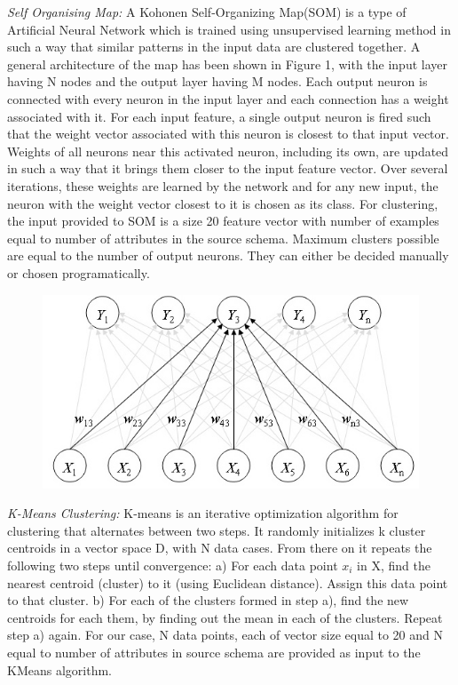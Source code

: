 \documentclass[conference]{IEEEtran}
\begin{document}
\textit{Self Organising Map\cite{SOM}: }A Kohonen Self-Organizing Map(SOM) is a type of Artificial Neural Network which is trained using unsupervised learning method in such a way that similar patterns in the input data are clustered together. A general architecture of the map has been shown in Figure 1, with the input layer having N nodes and the output layer having M nodes. Each output neuron is connected with every neuron in the input layer and each connection has a weight associated with it. For each input feature, a single output neuron is fired such that the weight vector associated with this neuron is closest to that input vector. Weights of all neurons near this activated neuron, including its own, are updated in such a way that it brings them closer to the input feature vector. Over several iterations, these weights are learned by the network and for any new input, the neuron with the weight vector closest to it is chosen as its class. For clustering, the input provided to SOM is a size 20 feature vector with number of examples equal to number of attributes in the source schema. Maximum clusters possible are equal to the number of output neurons. They can either be decided manually or chosen programatically. 

\begin{figure}[h]
\centering
\includegraphics[scale=0.4]{1.jpeg}
\end{figure}


\textit{K-Means Clustering: }K-means is an iterative optimization algorithm for clustering that alternates between two steps. It randomly initializes k cluster centroids in a vector space D, with N data cases. From there on it repeats the following two steps until convergence: a) For each data point $x_i$ in X, find the nearest
centroid (cluster) to it (using Euclidean distance). Assign this data point to that cluster. b) For each of the clusters formed in step a), find the new centroids for each them, by finding out the mean in each of the clusters. Repeat step a) again. For our case, N data points, each of vector size equal to 20 and N equal to number of attributes in source schema are provided as input to the KMeans algorithm. 
\end{document}
